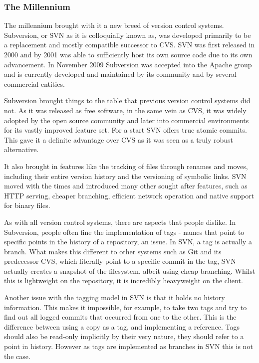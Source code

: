 \subsubsection{The Millennium}
The millennium brought with it a new breed of version control systems.  Subversion, or SVN as it is colloquially known as, was developed primarily to be a replacement and mostly compatible successor to CVS.  SVN was first released in 2000 and by 2001 was able to sufficiently host its own source code due to its own advancement.  In November 2009 Subversion was accepted into the Apache group and is currently developed and maintained by its community and by several commercial entities.

Subversion brought things to the table that previous version control systems did not.  As it was released as free software, in the same vein as CVS, it was widely adopted by the open source community and later into commercial environments for its vastly improved feature set.  For a start SVN offers true atomic commits.  This gave it a definite advantage over CVS as it was seen as a truly robust alternative.

It also brought in features like the tracking of files through renames and moves, including their entire version history and the versioning of symbolic links.  SVN moved with the times and introduced many other sought after features, such as HTTP serving, cheaper branching, efficient network operation and native support for binary files.  

As with all version control systems, there are aspects that people dislike.  In Subversion, people often fine the implementation of tags - names that point to specific points in the history of a repository, an issue.  In SVN, a tag is actually a branch.  What makes this different to other systems such as Git and its predecessor CVS, which literally point to a specific commit in the tag, SVN actually creates a snapshot of the filesystem, albeit using cheap branching.  Whilst this is lightweight on the repository, it is incredibly heavyweight on the client.

Another issue with the tagging model in SVN is that it holds no history information.  This makes it impossible, for example, to take two tags and try to find out all logged commits that occurred from one to the other.  This is the difference between using a copy as a tag, and implementing a reference.  Tags should also be read-only implicitly by their very nature, they should refer to a point in history.  However as tags are implemented as branches in SVN this is not the case.

